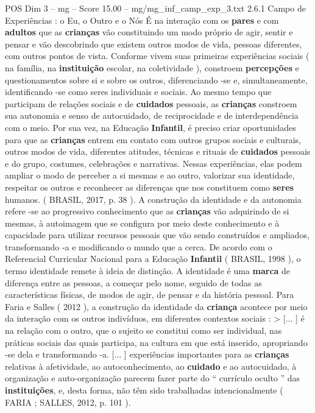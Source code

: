 \begin{textsample}{POS Dim 3 – mg – Score 15.00 – mg/mg\_inf\_camp\_exp\_3.txt}  \label{ex:f3_pos_269}
2.6.1 Campo de Experiências : o Eu, o Outro e o Nós É na interação com os \textbf{pares} e com \textbf{adultos} que as \textbf{crianças} vão constituindo um modo próprio de agir, sentir e pensar e vão descobrindo que existem outros modos de vida, pessoas diferentes, com outros pontos de vista.
Conforme vivem suas primeiras experiências sociais ( na família, na \textbf{instituição} escolar, na coletividade ), constroem \textbf{percepções} e questionamentos sobre si e sobre os outros, diferenciando -se e, simultaneamente, identificando -se como seres individuais e sociais.
Ao mesmo tempo que participam de relações sociais e de \textbf{cuidados} pessoais, as \textbf{crianças} constroem sua autonomia e senso de autocuidado, de reciprocidade e de interdependência com o meio.
Por sua vez, na Educação \textbf{Infantil}, é preciso criar oportunidades para que as \textbf{crianças} entrem em contato com outros grupos sociais e culturais, outros modos de vida, diferentes atitudes, técnicas e rituais de \textbf{cuidados} pessoais e do grupo, costumes, celebrações e narrativas.
Nessas experiências, elas podem ampliar o modo de perceber a si mesmas e ao outro, valorizar sua identidade, respeitar os outros e reconhecer as diferenças que nos constituem como \textbf{seres} humanos. ( BRASIL, 2017, p. 38 ).
A construção da identidade e da autonomia refere -se ao progressivo conhecimento que as \textbf{crianças} vão adquirindo de si mesmas, à autoimagem que se configura por meio deste conhecimento e à capacidade para utilizar recursos pessoais que vão sendo construídos e ampliados, transformando -a e modificando o mundo que a cerca.
De acordo com o Referencial Curricular Nacional para a Educação \textbf{Infantil} ( BRASIL, 1998 ), o termo identidade remete à ideia de distinção.
A identidade é uma \textbf{marca} de diferença entre as pessoas, a começar pelo nome, seguido de todas as características físicas, de modos de agir, de pensar e da história pessoal.
Para Faria e Salles ( 2012 ), a construção da identidade da \textbf{criança} acontece por meio da interação com os outros indivíduos, em diferentes contextos sociais : > [... ] é na relação com o outro, que o sujeito se constitui como ser individual, nas práticas sociais das quais participa, na cultura em que está inserido, apropriando -se dela e transformando -a. [... ] experiências importantes para as \textbf{crianças} relativas à afetividade, ao autoconhecimento, ao \textbf{cuidado} e ao autocuidado, à organização e auto-organização parecem fazer parte do “ currículo oculto ” das \textbf{instituições}, e, desta forma, não têm sido trabalhadas intencionalmente ( FARIA ; SALLES, 2012, p. 101 ).

\end{textsample}
